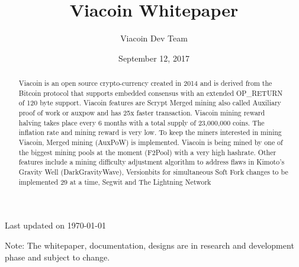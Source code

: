 \documentclass{article}
\author{Viacoin Dev Team}
\title{Viacoin Whitepaper}
\date{September 12, 2017}
\begin{document}
\maketitle

{\normalfont
      Last updated on \today}

\begin{abstract}\noindent
\normalsize Viacoin is an open source crypto-currency created in 2014 and is
derived from the \cite{bitcoin2008}Bitcoin protocol that supports embedded consensus with an
extended OP\_RETURN of 120 byte support. Viacoin features are Scrypt Merged mining
also called Auxiliary proof of work or auxpow and has 25x faster transaction.
Viacoin mining reward halving takes place every 6 months with a total supply of
23,000,000 coins. The inflation rate and mining reward is very low. To keep the
miners interested in mining Viacoin, Merged mining (AuxPoW) is implemented.
Viacoin is being mined by one of the biggest mining pools at the moment
(F2Pool) with a very high hashrate.
\linebreak
\noindent Other features include a mining difficulty adjustment algorithm to address flaws in Kimoto’s Gravity Well (DarkGravityWave),
Versionbits for simultaneous Soft Fork changes to be implemented 29 at a time, Segwit and The Lightning Network
\end{abstract}


\vfill \noindent
\small Note: The whitepaper, documentation, designs are in research and development phase and subject to change.
\newpage

\normalsize
\end{document}
